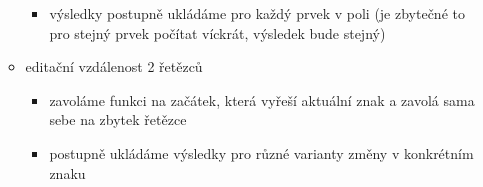\begin{itemize}
\begin{itemize}
\begin{itemize}
			\item výsledky postupně ukládáme pro každý prvek v poli (je zbytečné to pro stejný prvek počítat víckrát, výsledek bude stejný)
		\end{itemize}
		\item editační vzdálenost 2 řetězců
		\begin{itemize}
			\item zavoláme funkci na začátek, která vyřeší aktuální znak a zavolá sama sebe na zbytek řetězce
			\item postupně ukládáme výsledky pro různé varianty změny v konkrétním znaku
		\end{itemize}
	\end{itemize}
\end{itemize}